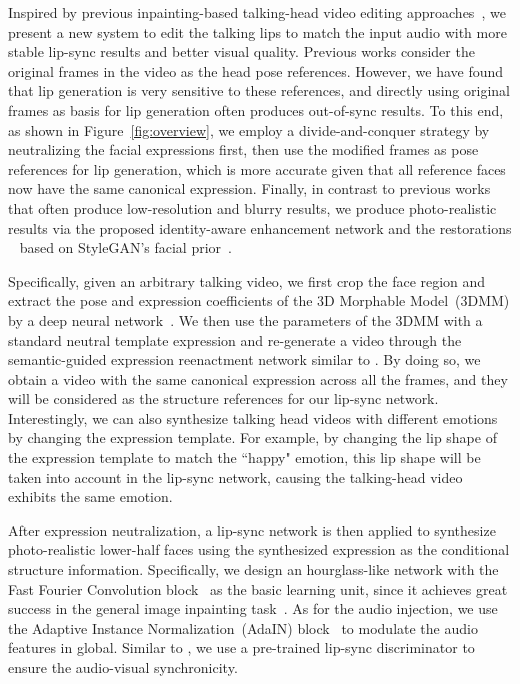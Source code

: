 Inspired by previous inpainting-based talking-head video editing approaches~\cite{wav2lip}, we present a new system to edit the talking lips to match the input audio with more stable lip-sync results and better visual quality. 
Previous works consider the original frames in the video as the head pose references. 
However, we have found that lip generation is very sensitive to these references, and directly using original frames as basis for lip generation often produces out-of-sync results. 
To this end, as shown in Figure~\ref{fig:overview}, we employ a divide-and-conquer strategy by neutralizing the facial expressions first, then use the modified frames as pose references for lip generation, which is more accurate given that all reference faces now have the same canonical expression. %
Finally, in contrast to previous works that often produce low-resolution and blurry results, we produce photo-realistic results via the proposed identity-aware enhancement network and the restorations ~\cite{gpen,gfpgan} based on StyleGAN's facial prior~\cite{stylegan}. 


Specifically, given an arbitrary talking video, we first crop the face region and extract the pose and expression coefficients of the 3D Morphable Model~(3DMM) by a deep neural network~\cite{face3d}. 
We then use the parameters of the 3DMM with a standard neutral template expression
and re-generate a video through the semantic-guided expression reenactment network similar to \cite{pirender}. 
By doing so, we obtain a video with the same canonical expression across all the frames, and they will be considered as the structure references for our lip-sync network. 
Interestingly, we can also synthesize talking head videos with different emotions by changing the expression template. 
For example, by changing the lip shape of the expression template to match the ``happy" emotion, this lip shape will be taken into account in the lip-sync network, causing the talking-head video exhibits the same emotion.

After expression neutralization, a lip-sync network is then applied to synthesize photo-realistic lower-half faces using the synthesized expression as the conditional structure information.
Specifically, we design an hourglass-like network with the Fast Fourier Convolution block~\cite{ffc} as the basic learning unit, since it achieves great success in the general image inpainting task~\cite{lama}. 
As for the audio injection, we use the Adaptive Instance Normalization~(AdaIN) block~\cite{huang2017adain} to modulate the audio features in global. 
Similar to \cite{wav2lip}, we use a pre-trained lip-sync discriminator to ensure the audio-visual synchronicity. 

